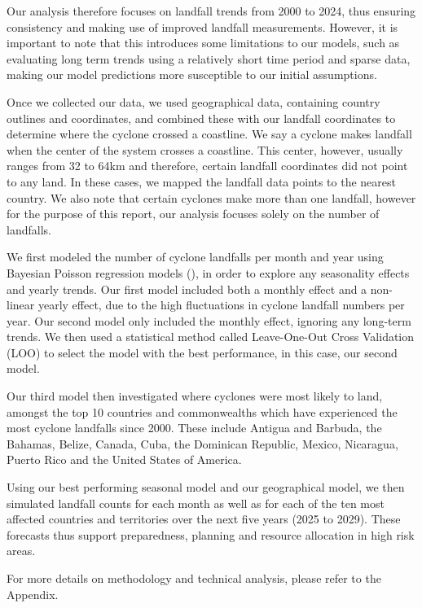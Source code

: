 \documentclass[
]{article}
\begin{document}
Our analysis therefore focuses on landfall trends from 2000 to 2024, thus ensuring consistency and making use of improved landfall measurements. However, it is important to note that this introduces some limitations to our models, such as evaluating long term trends using a relatively short time period and sparse data, making our model predictions more susceptible to our initial assumptions.

Once we collected our data, we used geographical data, containing country outlines and coordinates, and combined these with our landfall coordinates to determine where the cyclone crossed a coastline. We say a cyclone makes landfall when the center of the system crosses a coastline. This center, however, usually ranges from 32 to 64km and therefore, certain landfall coordinates did not point to any land. In these cases, we mapped the landfall data points to the nearest country. We also note that certain cyclones make more than one landfall, however for the purpose of this report, our analysis focuses solely on the number of landfalls.

We first modeled the number of cyclone landfalls per month and year using Bayesian Poisson regression models (), in order to explore any seasonality effects and yearly trends. Our first model included both a monthly effect and a non-linear yearly effect, due to the high fluctuations in cyclone landfall numbers per year. Our second model only included the monthly effect, ignoring any long-term trends. We then used a statistical method called Leave-One-Out Cross Validation (LOO) to select the model with the best performance, in this case, our second model.

Our third model then investigated where cyclones were most likely to land, amongst the top 10 countries and commonwealths which have experienced the most cyclone landfalls since 2000. These include Antigua and Barbuda, the Bahamas, Belize, Canada, Cuba, the Dominican Republic, Mexico, Nicaragua, Puerto Rico and the United States of America.

Using our best performing seasonal model and our geographical model, we then simulated landfall counts for each month as well as for each of the ten most affected countries and territories over the next five years (2025 to 2029). These forecasts thus support preparedness, planning and resource allocation in high risk areas.

For more details on methodology and technical analysis, please refer to the Appendix.
\end{document}
